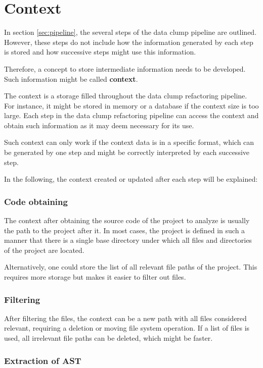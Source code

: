 \section{Context}
In section \ref{sec:pipeline}, the several steps of the data clump pipeline are outlined. However, these steps do not include how the information generated by each step is stored and how successive steps might use this information.

Therefore, a concept to store intermediate information needs to be developed. Such information might be called \textbf{context}.

The context is a storage filled throughout the data clump refactoring pipeline. For instance, it might be stored in memory or a database if the context size is too large. Each step in the data clump refactoring pipeline can access the context and obtain such information as it may deem necessary for its use.

Such context can only work if the context data is in a specific format, which can be generated by one step and might be correctly interpreted by each successive step. 

In the following, the context created or updated after each step will be explained:

\subsubsection{Code obtaining}
The context after obtaining the source code of the project to analyze is usually the path to the project after it. In most cases, the project is defined in such a manner that there is a single base directory under which all files and directories of the project are located.

Alternatively, one could store the list of all relevant file paths of the project. This requires more storage but makes it easier to filter out files.

\subsubsection{Filtering}
After filtering the files, the context can be a new path with all files considered relevant, requiring a deletion or moving file system operation. If a list of files is used, all irrelevant file paths can be deleted, which might be faster.

\subsubsection{Extraction of AST}
